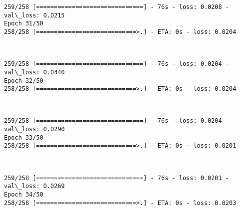 \documentclass[11pt]{article}
\begin{document}
    \begin{Verbatim}[commandchars=\\\{\}]
259/258 [==============================] - 76s - loss: 0.0208 - val\_loss: 0.0215
Epoch 31/50
258/258 [============================>.] - ETA: 0s - loss: 0.0204
    \end{Verbatim}

    \begin{center}
    \end{center}
    { \hspace*{\fill} \\}
    
    \begin{Verbatim}[commandchars=\\\{\}]
259/258 [==============================] - 76s - loss: 0.0204 - val\_loss: 0.0340
Epoch 32/50
258/258 [============================>.] - ETA: 0s - loss: 0.0204
    \end{Verbatim}

    \begin{center}
    \end{center}
    { \hspace*{\fill} \\}
    
    \begin{Verbatim}[commandchars=\\\{\}]
259/258 [==============================] - 76s - loss: 0.0204 - val\_loss: 0.0290
Epoch 33/50
258/258 [============================>.] - ETA: 0s - loss: 0.0201
    \end{Verbatim}

    \begin{center}
    \end{center}
    { \hspace*{\fill} \\}
    
    \begin{Verbatim}[commandchars=\\\{\}]
259/258 [==============================] - 76s - loss: 0.0201 - val\_loss: 0.0269
Epoch 34/50
258/258 [============================>.] - ETA: 0s - loss: 0.0203
    \end{Verbatim}

    \begin{center}
    \end{center}
    { \hspace*{\fill} \\}
    
\end{document}
